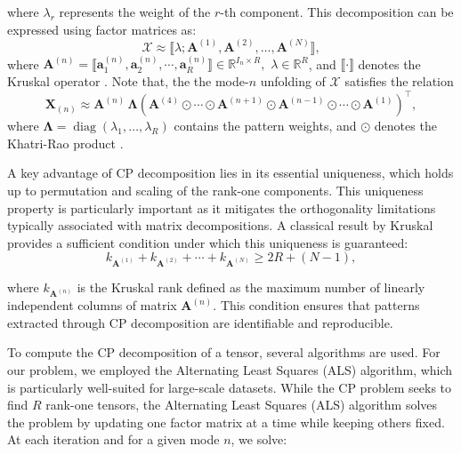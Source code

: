 \documentclass[pdflatex,sn-mathphys-num]{sn-jnl}
\theoremstyle{thmstyleone}
\theoremstyle{thmstyletwo}
\theoremstyle{thmstylethree}
\begin{document}
\noindent where $\lambda_r$ represents the weight of the $r$-th component. This decomposition can be expressed using factor matrices as: 
\begin{equation}
\mathcal{X} \approx \llbracket {\lambda}; \mathbf{A}^{(1)}, \mathbf{A}^{(2)}, \ldots, \mathbf{A}^{(N)} \rrbracket,
\label{eq:kruskal-form}
\end{equation}
\noindent where
\(
\mathbf{A}^{(n)} = \llbracket\mathbf{a}_{1}^{(n)}, \mathbf{a}_{2}^{(n)}, \cdots, \mathbf{a}_{R}^{(n)} \rrbracket \in \mathbb{R}^{I_n \times R}, 
\)
$\lambda \in \mathbb{R}^{R}$, and $\llbracket \cdot \rrbracket$ denotes the Kruskal operator \cite{kruskal1977three}. Note that, 
the the mode-$n$ unfolding of $\mathcal{X}$ satisfies the relation
\begin{equation} \label{eq:mode_n_unfolding}
\mathbf{X}_{(n)} \approx \mathbf{A}^{(n)} \, \boldsymbol{\Lambda} 
\left( \mathbf{A}^{(4)} \odot \cdots \odot \mathbf{A}^{(n+1)} \odot \mathbf{A}^{(n-1)} \odot \cdots \odot \mathbf{A}^{(1)} \right)^\top,
\end{equation}
where $\boldsymbol{\Lambda} = \operatorname{diag}(\lambda_1, \dots, \lambda_R)$ contains the pattern weights, and $\odot$ denotes the Khatri-Rao product \cite{kruskal1977three}.


A key advantage of CP decomposition lies in its essential uniqueness, which holds up to permutation and scaling of the rank-one components. This uniqueness property is particularly important as it mitigates the orthogonality limitations typically associated with matrix decompositions. A classical result by Kruskal provides a sufficient condition under which this uniqueness is guaranteed:
\begin{equation}
k_{\mathbf{A}^{(1)}} + k_{\mathbf{A}^{(2)}} + \cdots + k_{\mathbf{A}^{(N)}} \geq 2R + (N-1),
\end{equation}

\noindent where $k_{\mathbf{A}^{(n)}}$ is the Kruskal rank defined as the maximum number of linearly independent columns of matrix $\mathbf{A}^{(n)}$. This condition ensures that patterns extracted through CP decomposition are identifiable and reproducible.



To compute the CP decomposition of a tensor, several algorithms are used. For our problem, we employed the Alternating Least Squares (ALS) algorithm, which is particularly well-suited for large-scale datasets. While the CP problem seeks to find $R$ rank-one tensors, 
the Alternating Least Squares (ALS) algorithm solves the problem by updating one factor matrix at a time while keeping others fixed. At each iteration and for a given mode $n$, we solve:
\end{document}
